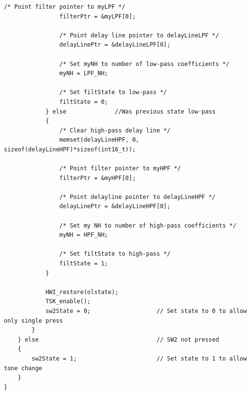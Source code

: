 \documentclass[11pt,pdftex,portrait,letterpaper]{article}
\begin{document}
\begin{lstlisting}[caption={audioProcessing.c}, label=l:program3]
				/* Point filter pointer to myLPF */
				filterPtr = &myLPF[0];

				/* Point delay line pointer to delayLineLPF */
				delayLinePtr = &delayLineLPF[0];

				/* Set myNH to number of low-pass coefficients */
				myNH = LPF_NH;

				/* Set filtState to low-pass */
				filtState = 0;
			} else				//Was previous state low-pass
			{
				/* Clear high-pass delay line */
				memset(delayLineHPF, 0, sizeof(delayLineHPF)*sizeof(int16_t));

				/* Point filter pointer to myHPF */
				filterPtr = &myHPF[0];

				/* Point delayline pointer to delayLineHPF */
				delayLinePtr = &delayLineHPF[0];

				/* Set my NH to number of high-pass coefficients */
				myNH = HPF_NH;

				/* Set filtState to high-pass */
				filtState = 1;
			}

			HWI_restore(olstate);
			TSK_enable();
			sw2State = 0;     				// Set state to 0 to allow only single press
		}
	} else                      			// SW2 not pressed
	{
		sw2State = 1;         				// Set state to 1 to allow tone change
	}
}
\end{lstlisting}
\pagebreak
\end{document}
